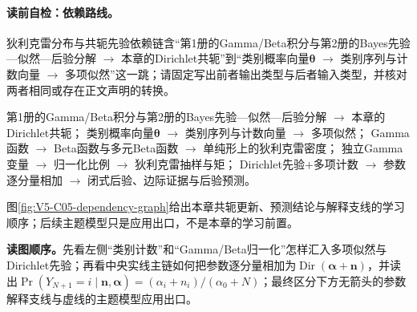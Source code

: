 \label{struct:V5-C05-CH04}
\paragraph{读前自检：依赖路线。}狄利克雷分布与共轭先验依赖链含“第1册的Gamma/Beta积分与第2册的Bayes先验—似然—后验分解 $\to$ 本章的Dirichlet共轭”到“类别概率向量$\boldsymbol\theta$ $\to$ 类别序列与计数向量 $\to$ 多项似然”这一跳；请固定写出前者输出类型与后者输入类型，并核对两者相同或存在正文声明的转换。\par

\begin{dependencybox}
第1册的Gamma/Beta积分与第2册的Bayes先验—似然—后验分解 $\to$ 本章的Dirichlet共轭；
类别概率向量$\boldsymbol\theta$
$\to$ 类别序列与计数向量
$\to$ 多项似然；
Gamma函数
$\to$ Beta函数与多元Beta函数
$\to$ 单纯形上的狄利克雷密度；
独立Gamma变量
$\to$ 归一化比例
$\to$ 狄利克雷抽样与矩；
Dirichlet先验$+$多项计数
$\to$ 参数逐分量相加
$\to$ 闭式后验、边际证据与后验预测。
\end{dependencybox}
图\ref{fig:V5-C05-dependency-graph}给出本章共轭更新、预测结论与解释支线的学习顺序；后续主题模型只是应用出口，不是本章的学习前置。

\FloatBarrier
\noindent\textbf{读图顺序。}先看左侧“类别计数”和“Gamma/Beta归一化”怎样汇入多项似然与Dirichlet先验；再看中央实线主链如何把参数逐分量相加为$\operatorname{Dir}(\boldsymbol\alpha+\boldsymbol n)$，并读出$\Pr(Y_{N+1}=i\mid\boldsymbol n,\boldsymbol\alpha)=(\alpha_i+n_i)/(\alpha_0+N)$；最终区分下方无箭头的参数解释支线与虚线的主题模型应用出口。\par

